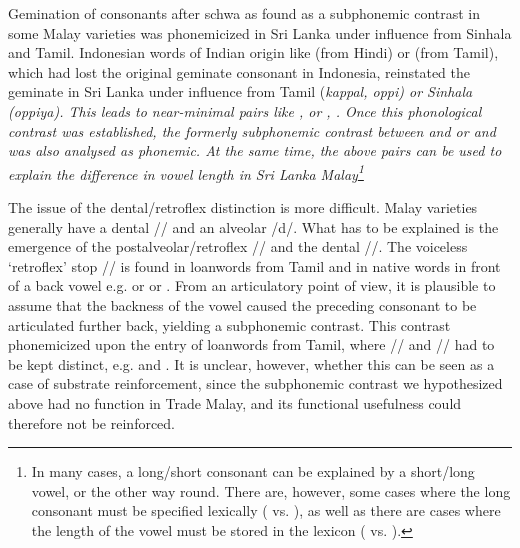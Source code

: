 Gemination of consonants after schwa as found as a subphonemic contrast in some Malay varieties was phonemicized in Sri Lanka under influence from Sinhala and Tamil. Indonesian words of Indian origin like  (from Hindi) or  (from Tamil), which had lost the original geminate consonant in Indonesia, reinstated the geminate in Sri Lanka under influence from Tamil (\em kappal, {\dentt}oppi\em) or Sinhala (\em {\dentt}oppiya\em). This leads to near-minimal pairs like ,  or  , . Once this phonological contrast was established, the formerly subphonemic contrast between  and  or  and  was also analysed as phonemic. At the same time, the above pairs can be used to explain the difference in vowel length in Sri Lanka Malay\footnote{In many cases, a long/short consonant can be explained by a short/long vowel, or the other way round. There are, however, some cases where the long consonant must be specified lexically ( vs. ), as well as there are cases where the length of the vowel must be stored in the lexicon  ( vs. ).
} 


The issue of the dental/retroflex distinction is more difficult. Malay varieties generally have a dental /\dentt/ and an alveolar /d/. What has to be explained is the emergence of the postalveolar/retroflex /\tz/ and the dental /\dentd/. The voiceless `retroflex' stop /\tz/ is found in loanwords from Tamil and in native words in front of a back vowel e.g.  or  or . From an articulatory point of view, it is plausible to assume that the backness of the vowel caused the preceding consonant to be articulated further back, yielding a subphonemic contrast. This contrast phonemicized upon the entry of loanwords from Tamil, where /\dentt/ and /\tz/ had to be kept distinct, e.g.  and . It is unclear, however, whether this can be seen as a case of substrate reinforcement, since the subphonemic contrast we hypothesized above had no function in Trade Malay, and its functional usefulness could therefore not be reinforced. 

